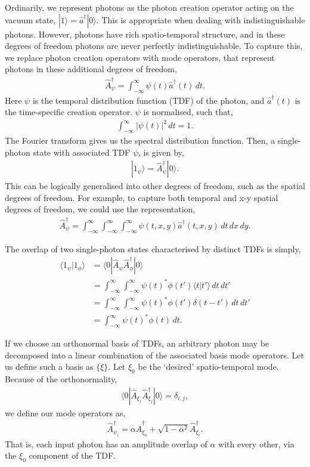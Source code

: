\documentclass[aps,pra,twocolumn,amsmath,amssymb,nofootinbib,superscriptaddress]{revtex4}
\newcommand{\bra}[1]{\langle#1|}
\newcommand{\ket}[1]{|#1\rangle}
\begin{document}
Ordinarily, we represent photons as the photon creation operator acting on the vacuum state, \mbox{$\ket{1}=\hat{a}^\dag\ket{0}$}. This is appropriate when dealing with indistinguishable photons. However, photons have rich spatio-temporal structure, and in these degrees of freedom photons are never perfectly indistinguishable. To capture this, we replace photon creation operators with mode operators, that represent photons in these additional degrees of freedom,
\begin{align}
\hat{A}^\dag_\psi = \int_{-\infty}^\infty \psi(t) \hat{a}^\dag(t) \,dt.
\end{align}
Here $\psi$ is the temporal distribution function (TDF) of the photon, and $\hat{a}^\dag(t)$ is the time-specific creation operator. $\psi$ is normalised, such that,
\begin{align}
\int_{-\infty}^\infty |\psi(t)|^2 \, dt = 1.
\end{align}
The Fourier transform gives us the spectral distribution function. Then, a single-photon state with associated TDF $\psi$, is given by,
\begin{align}
\ket{1_\psi} = \hat{A}^\dag_\psi \ket{0}.
\end{align}
This can be logically generalised into other degrees of freedom, such as the spatial degrees of freedom. For example, to capture both temporal and x-y spatial degrees of freedom, we could use the representation,
\begin{align}
\hat{A}^\dag_\psi = \int_{-\infty}^\infty \int_{-\infty}^\infty \int_{-\infty}^\infty \psi(t,x,y) \hat{a}^\dag(t,x,y) \, dt\, dx\, dy.
\end{align}

The overlap of two single-photon states characterised by distinct TDFs is simply,
\begin{align}
\langle 1_\psi | 1_\phi \rangle &= \bra{0} \hat{A}_{\psi} \hat{A}^\dag_{\phi} \ket{0} \nonumber \\
&= \int_{-\infty}^\infty \int_{-\infty}^\infty \psi(t)^*\phi(t') \langle t|t'\rangle \, dt \, dt' \nonumber \\
&= \int_{-\infty}^\infty \int_{-\infty}^\infty \psi(t)^*\phi(t') \delta(t-t')\,dt \, dt' \nonumber \\
&= \int_{-\infty}^\infty \psi(t)^*\phi(t) \,dt.
\end{align}

If we choose an orthonormal basis of TDFs, an arbitrary photon may be decomposed into a linear combination of the associated basis mode operators. Let us define such a basis as $\{\xi\}$. Let $\xi_0$ be the `desired' spatio-temporal mode. Because of the orthonormality,
\begin{align}
\bra{0} \hat{A}_{\xi_i} \hat{A}^\dag_{\xi_j} \ket{0} = \delta_{i,j},
\end{align}
we define our mode operators as,
\begin{align}
\hat{A}^\dag_{\psi_i} = \alpha \hat{A}^\dag_{\xi_0} + \sqrt{1-\alpha^2} \hat{A}^\dag_{\xi_i}.
\end{align}
That is, each input photon has an amplitude overlap of $\alpha$ with every other, via the $\xi_0$ component of the TDF.
\end{document}
